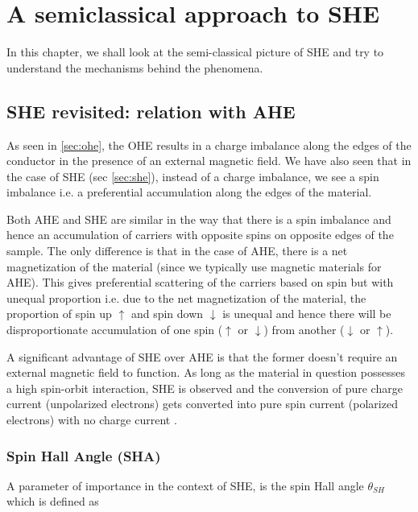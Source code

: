 \chapter{A semiclassical approach to SHE}

\label{chapter3}

In this chapter, we shall look at the semi-classical picture of SHE and try to understand the mechanisms behind the phenomena.

\section{SHE revisited: relation with AHE}

As seen in \cref{sec:ohe}, the OHE results in a charge imbalance along the edges of the conductor in the presence of an external magnetic field. We have also seen that in the case of SHE (sec \ref{sec:she}), instead of a charge imbalance, we see a spin imbalance i.e. a preferential accumulation along the edges of the material.

Both AHE and SHE are similar in the way that there is a spin imbalance and hence an accumulation of carriers with opposite spins on opposite edges of the sample.
The only difference is that in the case of AHE, there is a net magnetization of the material (since we typically use magnetic materials for AHE).
This gives preferential scattering of the carriers based on spin but with unequal proportion i.e. due to the net magnetization of the material, the proportion of spin up \( \uparrow \) and spin down \( \downarrow \) is unequal and hence there will be disproportionate accumulation of one spin ($ \uparrow $ or $ \downarrow $) from another ($ \downarrow $ or $ \uparrow $).

A significant advantage of SHE over AHE is that the former doesn't require an external magnetic field to function.
As long as the material in question possesses a high spin-orbit interaction, SHE is observed and the conversion of pure charge current (unpolarized electrons) gets converted into pure spin current (polarized electrons) with no charge current \cite{hirsch1999spin}.

\subsection{Spin Hall Angle (SHA)}

\label{subsec:spin-angle}

A parameter of importance in the context of SHE, is the spin Hall angle \( \theta_{SH} \) which is defined as

